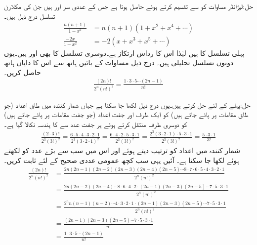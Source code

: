 حل:لیژانڈر مساوات کو  سے تقسیم کرتے ہوئے  حاصل ہوتا ہے جس کے عددی سر  اور  ہیں جن کی مکلارن تسلسل درج ذیل ہیں۔
\begin{align*}
\frac{n(n+1)}{1-x^2}&=n(n+1)(1+x^2+x^4+\cdots)\\
\frac{-2x}{1-x^2}&=-2(x+x^3+x^5+\cdots)
\end{align*}
پہلی تسلسل کا  ہیں لہٰذا اس کا رداس ارتکاز  ہے۔دوسری تسلسل کا بھی  اور  ہیں۔یوں دونوں تسلسل تحلیلی ہیں۔
درج ذیل مساوات کے بائیں ہاتھ سے اس کا دایاں ہاتھ حاصل کریں۔
\begin{align*}
\frac{(2n)!}{2^n(n!)^2}=\frac{1\cdot 3\cdot 5\cdots (2n-1)}{n!}
\end{align*}

حل:پہلے   کے لئے حل کرتے ہیں۔یوں درج ذیل لکھا جا سکتا ہے جہاں شمار کنندہ میں طاق اعداد (جو طاق مقامات پر پائے جاتے ہیں) کو ایک طرف اور جفت اعداد (جو جفت مقامات پر پائے جاتے ہیں) کو دوسری طرف منتقل کرتے ہوئے ہر جفت عدد سے  کا ہندسہ نکالا گیا ہے۔ 
\begin{align*}
\frac{(2\cdot 3)!}{2^3(3!)^2}=\frac{6\cdot 5\cdot 4\cdot 3\cdot 2\cdot 1}{2^3(3\cdot 2\cdot 1)^2}=\frac{6\cdot 4\cdot 2\cdot 5\cdot 3\cdot 1}{2^3(3!)^2}=\frac{2^3(3\cdot 2\cdot 1)\cdot 5\cdot 3\cdot 1}{2^3(3!)^2}=\frac{5\cdot 3\cdot 1}{3!}
\end{align*}
شمار کنندہ میں اعداد کو ترتیب دیتے ہوئے اور اس میں سب سے بڑے عدد  کو  لکھتے ہوئے   لکھا جا سکتا ہے۔ آئیں یہی سب کچھ عمومی عددی صحیح  کے لئے ثابت کریں۔
\begin{align*}
\frac{(2n)!}{2^n(n!)^2}&=\frac{2n(2n-1)(2n-2)(2n-3)(2n-4)(2n-5)\cdots 8\cdot 7\cdot 6\cdot 5 \cdot 4\cdot 3\cdot 2\cdot 1 }{2^n(n!)^2}\\
&=\frac{2n(2n-2)(2n-4)\cdots 8\cdot 6\cdot 4\cdot 2\cdot (2n-1)(2n-3)(2n-5)\cdots 7\cdot 5\cdot 3\cdot 1}{2^n(n!)^2}\\
&=\frac{2^n n(n-1)(n-2)\cdots 4\cdot 3\cdot 2\cdot 1\cdot (2n-1)(2n-3)(2n-5)\cdots 7\cdot 5\cdot 3\cdot 1}{2^n(n!)^2}\\
&=\frac{(2n-1)(2n-3)(2n-5)\cdots 7\cdot 5\cdot 3\cdot 1}{n!}\\
&=\frac{1\cdot 3\cdot 5\cdots (2n-1)}{n!}
\end{align*}

